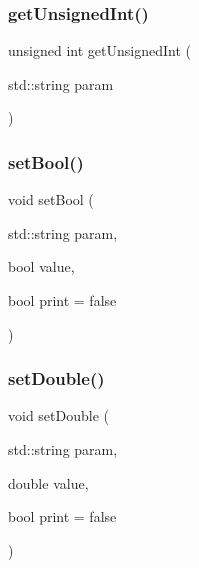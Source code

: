 \mbox{\label{classparameters_class_ac01aa6fa0c3b6914b0e7b75128c99bc3}} 
\subsubsection{\texorpdfstring{getUnsignedInt()}{getUnsignedInt()}}
{\footnotesize\ttfamily unsigned int get\+Unsigned\+Int (\begin{DoxyParamCaption}\item[{std\+::string}]{param }\end{DoxyParamCaption})}

\mbox{\label{classparameters_class_a182ca3f26a78847edd31e99fe68059da}} 
\subsubsection{\texorpdfstring{setBool()}{setBool()}}
{\footnotesize\ttfamily void set\+Bool (\begin{DoxyParamCaption}\item[{std\+::string}]{param,  }\item[{bool}]{value,  }\item[{bool}]{print = {\ttfamily false} }\end{DoxyParamCaption})}

\mbox{\label{classparameters_class_ab2755d1057bef657585eb7fdb7d4b5c4}} 
\subsubsection{\texorpdfstring{setDouble()}{setDouble()}}
{\footnotesize\ttfamily void set\+Double (\begin{DoxyParamCaption}\item[{std\+::string}]{param,  }\item[{double}]{value,  }\item[{bool}]{print = {\ttfamily false} }\end{DoxyParamCaption})}

\mbox{\label{classparameters_class_a68203d58af0caf8d232ca9a6fcb0a190}} 
